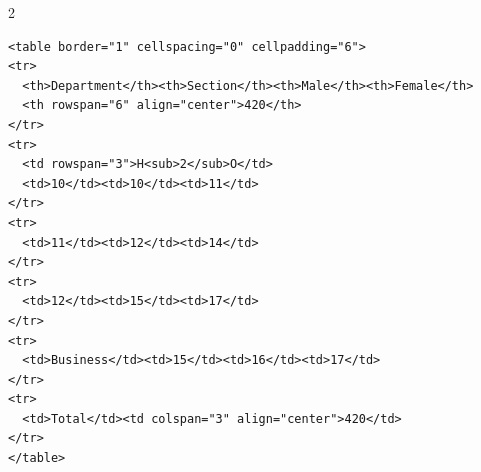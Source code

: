 \par{}\par\smallskip
\begin{multicols}{2}
\begin{verbatim}
<table border="1" cellspacing="0" cellpadding="6">
<tr>
  <th>Department</th><th>Section</th><th>Male</th><th>Female</th>
  <th rowspan="6" align="center">420</th>
</tr>
<tr>
  <td rowspan="3">H<sub>2</sub>O</td>
  <td>10</td><td>10</td><td>11</td>
</tr>
<tr>
  <td>11</td><td>12</td><td>14</td>
</tr>
<tr>
  <td>12</td><td>15</td><td>17</td>
</tr>
<tr>
  <td>Business</td><td>15</td><td>16</td><td>17</td>
</tr>
<tr>
  <td>Total</td><td colspan="3" align="center">420</td>
</tr>
</table>
\end{verbatim}
\end{multicols}
\smallskip


